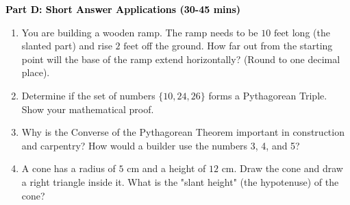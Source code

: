 \documentclass[12pt, letterpaper, fleqn]{article}
\begin{document}
\newpage

\begin{tcolorbox}[colback=customteal!20]
\large\textcolor{black}{\textbf{Part D: Short Answer Applications (30-45 mins)}}
\end{tcolorbox}

\vspace{3mm}

\begin{enumerate}[itemsep=4.2cm, leftmargin=0.6cm, resume]
\item You are building a wooden ramp. The ramp needs to be $10\text{ feet}$ long (the slanted part) and rise $2\text{ feet}$ off the ground. How far out from the starting point will the base of the ramp extend horizontally? (Round to one decimal place).
\item Determine if the set of numbers $\{10, 24, 26\}$ forms a Pythagorean Triple. Show your mathematical proof.
\item Why is the Converse of the Pythagorean Theorem important in construction and carpentry? How would a builder use the numbers 3, 4, and 5?
\item A cone has a radius of $5\text{ cm}$ and a height of $12\text{ cm}$. Draw the cone and draw a right triangle inside it. What is the "slant height" (the hypotenuse) of the cone?
\end{enumerate}
\end{document}
